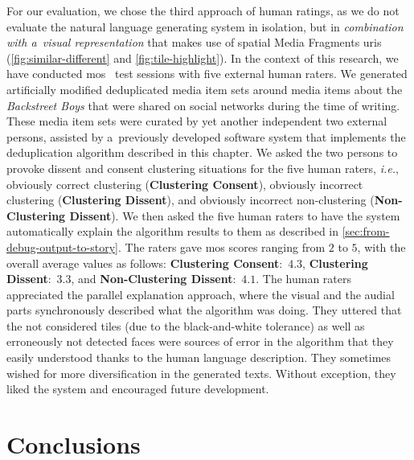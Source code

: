 For our evaluation, we chose the third approach of human ratings,
as we do not evaluate the natural language generating system in isolation,
but in \emph{combination with a~visual representation}
that makes use of spatial Media Fragments {\sc uri}s
(\autoref{fig:similar-different} and \autoref{fig:tile-highlight}).
In the context of this research,
we have conducted {\sc mos}~\cite{itu1998mos} test sessions
with five external human raters.
We generated artificially modified deduplicated media item sets
around media items about the \emph{Backstreet Boys}
that were shared on social networks during the time of writing.
These media item sets were curated by yet another independent two external persons,
assisted by a~previously developed software system
that implements the deduplication algorithm described in this chapter.
We asked the two persons to provoke dissent and consent clustering situations
for the five human raters, \emph{i.e.}, obviously correct clustering
(\textbf{Clustering Consent}), obviously incorrect clustering
(\textbf{Clustering Dissent}), and obviously incorrect non-clustering
(\textbf{Non-Clustering Dissent}).
We then asked the five human raters to have the system
automatically explain the algorithm results to them
as described in \autoref{sec:from-debug-output-to-story}.
The raters gave {\sc mos} scores ranging from $2$ to $5$,
with the overall average values as follows:
\textbf{Clustering Consent}:~$4.3$, \textbf{Clustering Dissent}:~$3.3$,
and \textbf{Non-Clustering Dissent}:~$4.1$.
The human raters appreciated the parallel explanation approach,
where the visual and the audial parts synchronously described
what the algorithm was doing.
They uttered that the not considered tiles (due to the black-and-white tolerance)
as well as erroneously not detected faces were sources of error
in the algorithm that they easily understood
thanks to the human language description.
They sometimes wished for more diversification in the generated texts.
Without exception, they liked the system and encouraged future development.

\section{Conclusions}

